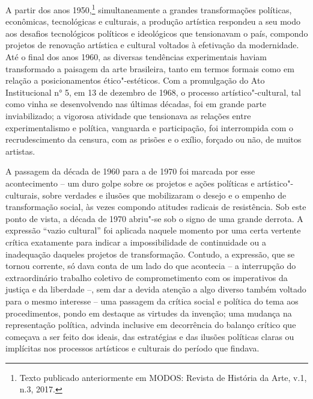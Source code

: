 \pagebreak
\thispagestyle{empty}

\movetooddpage

A partir dos anos 1950,\footnote{Texto
  publicado anteriormente em \textsc{MODOS}: Revista de História da Arte, v.1,
  n.3, 2017.} simultaneamente a grandes transformações
políticas, econômicas, tecnológicas e culturais, a produção artística
respondeu a seu modo aos desafios tecnológicos políticos e ideológicos
que tensionavam o país, compondo projetos de renovação artística e
cultural voltados à efetivação da modernidade. Até o final dos anos
1960, as diversas tendências experimentais haviam transformado a
paisagem da arte brasileira, tanto em termos formais como em relação a
posicionamentos ético"-estéticos. Com a promulgação do Ato Institucional
n° 5, em 13 de dezembro de 1968, o processo artístico"-cultural, tal como
vinha se desenvolvendo nas últimas décadas, foi em grande parte
inviabilizado; a vigorosa atividade que tensionava as relações entre
experimentalismo e política, vanguarda e participação, foi interrompida
com o recrudescimento da censura, com as prisões e o exílio, forçado ou
não, de muitos artistas.

A passagem da década de 1960 para a de 1970 foi marcada por esse
acontecimento -- um duro golpe sobre os projetos e ações políticas e
artístico"-culturais, sobre verdades e ilusões que mobilizaram o desejo e
o empenho de transformação social, às vezes compondo atitudes radicais
de resistência. Sob este ponto de vista, a década de 1970 abriu"-se sob o
signo de uma grande derrota. A expressão ``vazio cultural'' foi aplicada
naquele momento por uma certa vertente crítica exatamente para indicar a
impossibilidade de continuidade ou a inadequação daqueles projetos de
transformação. Contudo, a expressão, que se tornou corrente, só dava
conta de um lado do que acontecia -- a interrupção do extraordinário
trabalho coletivo de comprometimento com os imperativos da justiça e da
liberdade --, sem dar a devida atenção a algo diverso também voltado
para o mesmo interesse -- uma passagem da crítica social e política do
tema aos procedimentos, pondo em destaque as virtudes da invenção; uma
mudança na representação política, advinda inclusive em decorrência do
balanço crítico que começava a ser feito dos ideais, das estratégias e
das ilusões políticas claras ou implícitas nos processos artísticos e
culturais do período que findava.

